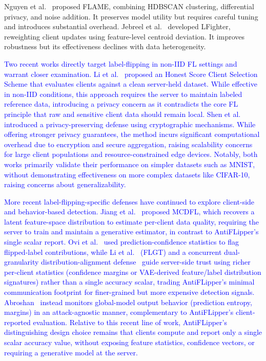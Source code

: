 \documentclass[conference]{IEEEtran}
\begin{document}
Nguyen et al.~\cite{nguyen2022flame} proposed FLAME, combining HDBSCAN clustering, differential privacy, and noise addition. It preserves model utility but requires careful tuning and introduces substantial overhead. Jebreel et al.~\cite{jebreel2024lfighter} developed LFighter, reweighting client updates using feature-level centroid deviation. It improves robustness but its effectiveness declines with data heterogeneity.

\textcolor{blue}{Two recent works directly target label-flipping in non-IID FL settings and warrant closer examination. Li et al.~\cite{li2023hscs} proposed an Honest Score Client Selection Scheme that evaluates clients against a clean server-held dataset. While effective in non-IID conditions, this approach requires the server to maintain labeled reference data, introducing a privacy concern as it  contradicts the core FL principle that raw and sensitive client data should remain local. Shen et al.~\cite{shen2024lfrppfl} introduced a privacy-preserving defense using cryptographic mechanisms. While offering stronger privacy guarantees, the method incurs significant computational overhead due to encryption and secure aggregation, raising scalability concerns for large client populations and resource-constrained edge devices. Notably, both works primarily validate their performance on simpler datasets such as MNIST, without demonstrating effectiveness on more complex datasets like CIFAR-10, raising concerns about generalizability. }

\textcolor{blue}{More recent label-flipping-specific defenses have continued to explore client-side and behavior-based detection. Jiang et al.~\cite{jiang2023dataquality} proposed MCDFL, which recovers a latent feature-space distribution to estimate per-client data quality, requiring the server to train and maintain a generative estimator, in contrast to AntiFLipper's single scalar report. Ovi et al.~\cite{ovi2023confident} used prediction-confidence statistics to flag flipped-label contributions, while Li et al.~\cite{li2025flgt} (FLGT) and a concurrent dual-granularity distribution-alignment defense~\cite{fedalign2026} guide server-side trust using richer per-client statistics (confidence margins or VAE-derived feature/label distribution signatures) rather than a single accuracy scalar, trading AntiFLipper's minimal communication footprint for finer-grained but more expensive detection signals. Abroshan~\cite{abroshan2025aitoprotect} instead monitors global-model output behavior (prediction entropy, margins) in an attack-agnostic manner, complementary to AntiFLipper's client-reported evaluation. Relative to this recent line of work, AntiFLipper's distinguishing design choice remains that clients compute and report only a single scalar accuracy value, without exposing feature statistics, confidence vectors, or requiring a generative model at the server.}
\end{document}
